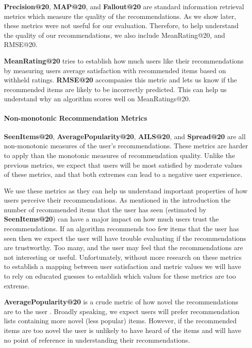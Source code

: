 \documentclass[letterpaper]{sig-alternate}
\begin{document}
  {\bf Precision@20}, {\bf MAP@20}, and {\bf Fallout@20} are standard information retrieval metrics which measure the quality of the recommendations.
  As we show later, these metrics were not useful for our evaluation.
  Therefore, to help understand the quality of our recommendations, we also include MeanRating@20, and RMSE@20.

  {\bf MeanRating@20} tries to establish how much users like their recommendations by measuring users average satisfaction with recommended items based on withheld ratings.
  {\bf RMSE@20} accompanies this metric and lets us know if the recommended items are likely to be incorrectly predicted. 
  This can help us understand why an algorithm scores well on MeanRatings@20.  
  
  \paragraph{Non-monotonic Recommendation Metrics}
  {\bf SeenItems@20}, {\bf AveragePopularity@20}, {\bf AILS@20}, and {\bf Spread@20} are all non-monotonic measures of the user's recommendations.
  These metrics are harder to apply than the monotonic measures of recommendation quality.
  Unlike the previous metrics, we expect that users will be most satisfied by moderate values of these metrics, and that both extremes can lead to a negative user experience.

  We use these metrics as they can help us understand important properties of how users perceive their recommendations.
  As mentioned in the introduction the number of recommended items that the user has seen (estimated by {\bf SeenItems@20}) can have a major impact on how much users trust the recommendations.
  If an algorithm recommends too few items that the user has seen then we expect the user will have trouble evaluating if the recommendations are trustworthy.
  Too many, and the user may feel that the recommendations are not interesting or useful.
  Unfortunately, without more research on these metrics to establish a mapping between user satisfaction and metric values we will have to rely on educated guesses to establish which values for these metrics are too extreme.

  {\bf AveragePopularity@20} is a crude metric of how novel the recommendations are to the user \cite{zieglerDiversity}.
  Broadly speaking, we expect users will prefer recommendation lists containing more novel (less popular) items.
  However, if the recommended items are too novel the user is unlikely to have heard of the items and will have no point of reference in understanding their recommendations.
\end{document}
